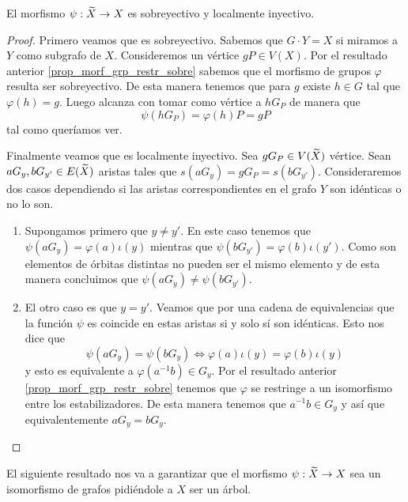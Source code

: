 \documentclass[tesis.tex]{subfiles}
\begin{document}
\begin{prop}
	El morfismo $\psi: \widetilde X \to X$ es sobreyectivo y localmente inyectivo.
\end{prop}
\begin{proof}
	Primero veamos que es sobreyectivo.
	Sabemos que $G \cdot Y = X$ si miramos a $Y$ como subgrafo de $X$.
	Consideremos un vértice $gP \in V(X)$. 
	Por el resultado anterior \ref{prop_morf_grp_restr_sobre} sabemos que el morfismo de grupos $\varphi$ resulta ser sobreyectivo.
	De esta manera tenemos que para $g$ existe $h \in G$ tal que $\varphi(h) = g$. 
	Luego alcanza con tomar como vértice a $h G_P $ de manera que 
	\[
	\psi(h G_P ) = \varphi(h) P = g P 
	\]
	tal como queríamos ver.
	
	
	Finalmente veamos que es localmente inyectivo.
	Sea $gG_{P} \in V(\widetilde X)$ vértice. 
	Sean $aG_{y},bG_{y' }\in E(\widetilde X)$ aristas tales que $s(aG_{y}) = gG_{P} = s(bG_{y' })$.
	Consideraremos dos casos dependiendo si las aristas correspondientes en el grafo $Y$ son idénticas o no lo son.
	
	\begin{enumerate}
		\item Supongamos primero que $y \neq y'$.
		En este caso tenemos que $\psi(aG_{y}) = \varphi(a) \iota (y)$ mientras que $\psi(bG_{y'}) = \varphi(b) \iota (y')$.
		Como son elementos de órbitas distintas no pueden ser el mismo elemento y de esta manera concluimos que $\psi(aG_{y}) \neq \psi(bG_{y'}).$
		
		\item El otro caso es que $y=y'$. 
		Veamos que por una cadena de equivalencias que la función $\psi$ es coincide en estas aristas si y solo sí son idénticas.
		Esto nos dice que
		\[
			\psi(aG_{y}) = \psi(bG_{y}) \iff \varphi(a) \iota(y) = \varphi(b)\iota(y)
		\]
		y esto es equivalente a $\varphi(a^{-1}b) \in G_{y}$.
		Por el resultado anterior \ref{prop_morf_grp_restr_sobre} tenemos que $\varphi$ se restringe a un isomorfismo entre los estabilizadores.
		De esta manera tenemos que $a^{-1}b \in G_{y}$ y así que equivalentemente $aG_{y} = bG_{y}$.
		
	\end{enumerate}
\end{proof}

El siguiente resultado nos va a garantizar que el morfismo $\psi: \widetilde X \to X$ sea un isomorfismo de grafos pidiéndole a $X$ ser un árbol.
\end{document}
